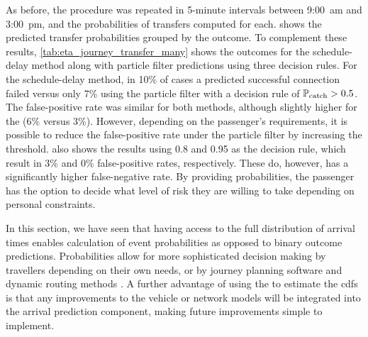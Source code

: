 As before, the procedure was repeated in 5-minute intervals between  9:00~am and  3:00~pm, and the probabilities of transfers computed for each.  shows the predicted transfer probabilities grouped by the outcome. To complement these results, \cref{tab:eta_journey_transfer_many} shows the outcomes for the schedule-delay method along with particle filter predictions using three decision rules. For the schedule-delay method, in 10\% of cases a predicted successful connection failed versus only 7\% using the particle filter with a decision rule of $\mathbb{P}_\text{catch} > 0.5$. The false-positive rate was similar for both methods, although slightly higher for the \pf{} (6\% versus 3\%). However, depending on the passenger's requirements, it is possible to reduce the false-positive rate under the particle filter by increasing the threshold.    also shows the results using 0.8 and 0.95 as the decision rule, which result in 3\% and 0\% false-positive rates, respectively. These do, however, has a significantly higher false-negative rate. By providing probabilities, the passenger has the option to decide what level of risk they are willing to take depending on personal constraints.


In this section, we have seen that having access to the full distribution of arrival times enables calculation of event probabilities as opposed to binary outcome predictions. Probabilities allow for more sophisticated decision making by travellers depending on their own needs, or by journey planning software and dynamic routing methods \citep{Berczi_2017}. A further advantage of using the \pf{} to estimate the \glspl{cdf} is that any improvements to the vehicle or network models will be integrated into the arrival prediction component, making future improvements simple to implement.
